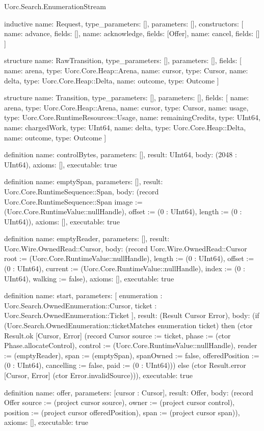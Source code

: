 \begin{lexlean}{Uorc.Search.EnumerationStream}
\begin{semanticmodule}
inductive{
  name: Request,
  type_parameters: [],
  parameters: [],
  constructors: [
    {name: advance, fields: []},
    {name: acknowledge, fields: [Offer]},
    {name: cancel, fields: []}
  ]
}

structure{
  name: RawTransition,
  type_parameters: [],
  parameters: [],
  fields: [
    {name: arena, type: Uorc.Core.Heap::Arena},
    {name: cursor, type: Cursor},
    {name: delta, type: Uorc.Core.Heap::Delta},
    {name: outcome, type: Outcome}
  ]
}

structure{
  name: Transition,
  type_parameters: [],
  parameters: [],
  fields: [
    {name: arena, type: Uorc.Core.Heap::Arena},
    {name: cursor, type: Cursor},
    {name: usage, type: Uorc.Core.RuntimeResources::Usage},
    {name: remainingCredits, type: UInt64},
    {name: chargedWork, type: UInt64},
    {name: delta, type: Uorc.Core.Heap::Delta},
    {name: outcome, type: Outcome}
  ]
}

definition{
  name: controlBytes,
  parameters: [],
  result: UInt64,
  body: (2048 : UInt64),
  axioms: [],
  executable: true
}

definition{
  name: emptySpan,
  parameters: [],
  result: Uorc.Core.RuntimeSequence::Span,
  body: (record Uorc.Core.RuntimeSequence::Span {image := (Uorc.Core.RuntimeValue::nullHandle), offset := (0 : UInt64), length := (0 : UInt64)}),
  axioms: [],
  executable: true
}

definition{
  name: emptyReader,
  parameters: [],
  result: Uorc.Wire.OwnedRead::Cursor,
  body: (record Uorc.Wire.OwnedRead::Cursor {root := (Uorc.Core.RuntimeValue::nullHandle), length := (0 : UInt64), offset := (0 : UInt64), current := (Uorc.Core.RuntimeValue::nullHandle), index := (0 : UInt64), walking := false}),
  axioms: [],
  executable: true
}

definition{
  name: start,
  parameters: [
    enumeration : Uorc.Search.OwnedEnumeration::Cursor,
    ticket : Uorc.Search.OwnedEnumeration::Ticket
  ],
  result: (Result Cursor Error),
  body: (if (Uorc.Search.OwnedEnumeration::ticketMatches enumeration ticket) then (ctor Result.ok [Cursor, Error] (record Cursor {source := ticket, phase := (ctor Phase.allocateControl), control := (Uorc.Core.RuntimeValue::nullHandle), reader := (emptyReader), span := (emptySpan), spanOwned := false, offeredPosition := (0 : UInt64), cancelling := false, paid := (0 : UInt64)})) else (ctor Result.error [Cursor, Error] (ctor Error.invalidSource))),
  executable: true
}

definition{
  name: offer,
  parameters: [cursor : Cursor],
  result: Offer,
  body: (record Offer {source := (project cursor source), owner := (project cursor control), position := (project cursor offeredPosition), span := (project cursor span)}),
  axioms: [],
  executable: true
}


\end{semanticmodule}
\end{lexlean}
